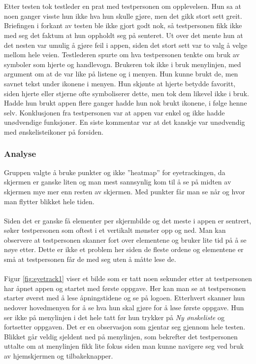 \\\\
Etter testen tok testleder en prat med testpersonen om opplevelsen. Hun sa at noen ganger visste hun ikke hva hun skulle gjøre, men det gikk stort sett greit. Briefingen i forkant av testen ble ikke gjort godt nok, så testpersonen fikk ikke med seg det faktum at hun oppholdt seg på senteret. Ut over det mente hun at det nesten var umulig å gjøre feil i appen, siden det stort sett var to valg å velge mellom hele veien. Testlederen spurte om hva testpersonen tenkte om bruk av symboler som hjerte og handlevogn. Brukeren tok ikke i bruk menylinjen, med argument om at de var like på listene og i menyen. Hun kunne brukt de, men savnet tekst under ikonene i menyen. Hun skjønte at hjerte betydde favoritt, siden hjerte eller stjerne ofte symboliserer dette, men tok dem likevel ikke i bruk. Hadde hun brukt appen flere ganger hadde hun nok brukt ikonene, i følge henne selv. Konklusjonen fra testpersonen var at appen var enkel og ikke hadde unødvendige funksjoner. En siste kommentar var at det kanskje var unødvendig med ønskelisteikoner på forsiden.

\subsubsection{Analyse}
Gruppen valgte å bruke punkter og ikke ''heatmap'' for eyetrackingen, da skjermen er ganske liten og man mest sannsynlig kom til å se på midten av skjermen mye mer enn resten av skjermen. Med punkter får man se når og hvor man flytter blikket hele tiden.
\\\\
Siden det er ganske få elementer per skjermbilde og det meste i appen er sentrert, søker testpersonen som oftest i et vertikalt mønster opp og ned. Man kan observere at testpersonen skanner fort over elementene og bruker lite tid på å se nøye etter. Dette er ikke et problem her siden de fleste ordene og elementene er små at testpersonen får de med seg uten å måtte lese de. 
\\\\
Figur \ref{fig:eyetrack1} viser et bilde som er tatt noen sekunder etter at testpersonen har åpnet appen og startet med første oppgave. Her kan man se at testpersonen starter øverst med å lese åpningstidene og se på logoen. Etterhvert skanner hun nedover hovedmenyen for å se hva hun skal gjøre for å løse første oppgave. Hun ser ikke på menylinjen i det hele tatt før hun trykker på \textit{Ny ønskeliste} og fortsetter oppgaven. Det er en observasjon som gjentar seg gjennom hele testen. Blikket går veldig sjeldent ned på menylinjen, som bekrefter det testpersonen uttalte om at menylinjen fikk lite fokus siden man kunne navigere seg ved bruk av hjemskjermen og tilbakeknapper. 

